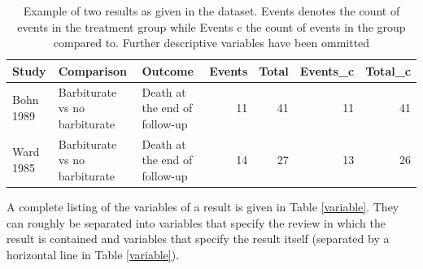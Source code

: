 \documentclass[11pt,a4paper,twoside]{book}\usepackage[]{graphicx}\usepackage[]{color}
\begin{document}
\begin{table}[ht]
\centering
\begingroup\scriptsize
\begin{tabular}{lllrrrr}
  \hline
Study & Comparison & Outcome & Events & Total & Events\_c & Total\_c \\ 
  \hline
Bohn 1989 & Barbiturate vs no barbiturate & Death at the end of follow-up & 11 & 41 & 11 & 41 \\ 
  Ward 1985 & Barbiturate vs no barbiturate & Death at the end of follow-up & 14 & 27 & 13 & 26 \\ 
   \hline
\end{tabular}
\endgroup
\caption{Example of two results as given in the dataset. Events denotes the count of events in the treatment group while Events c the count of events in the group compared to. Further descriptive variables have been ommitted} 
\label{barbiturate.row}
\end{table}


A complete listing of the variables of a result is given in Table \ref{variable}. They can roughly be separated into variables that specify the review in which the result is contained and variables that specify the result itself (separated by a horizontal line in Table \ref{variable}).
\end{document}
